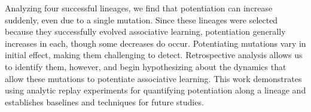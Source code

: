 Analyzing four successful lineages, we find that potentiation can increase suddenly, even due to a single mutation.
Since these lineages were selected because they successfully evolved associative learning, potentiation generally increases in each, though some decreases do occur.
Potentiating mutations vary in initial effect, making them challenging to detect.
Retrospective analysis allows us to identify them, however, and begin hypothesizing about the dynamics that allow these mutations to potentiate associative learning.
This work demonstrates using analytic replay experiments for quantifying potentiation along a lineage and establishes baselines and techniques for future studies. 
